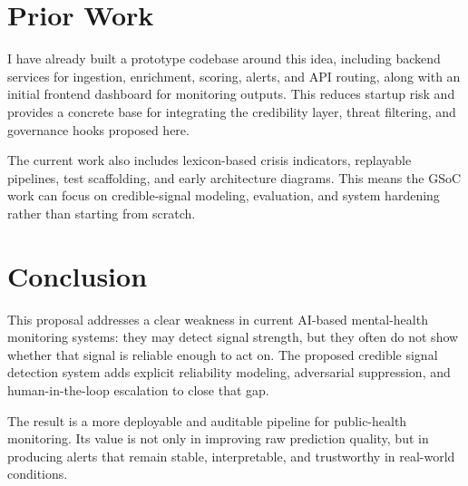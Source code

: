\documentclass[11pt,a4paper]{article}
\begin{document}
\section{Prior Work}

I have already built a prototype codebase around this idea, including backend services for ingestion, enrichment, scoring, alerts, and API routing, along with an initial frontend dashboard for monitoring outputs. This reduces startup risk and provides a concrete base for integrating the credibility layer, threat filtering, and governance hooks proposed here.

The current work also includes lexicon-based crisis indicators, replayable pipelines, test scaffolding, and early architecture diagrams. This means the GSoC work can focus on credible-signal modeling, evaluation, and system hardening rather than starting from scratch.

\section{Conclusion}

This proposal addresses a clear weakness in current AI-based mental-health monitoring systems: they may detect signal strength, but they often do not show whether that signal is reliable enough to act on. The proposed credible signal detection system adds explicit reliability modeling, adversarial suppression, and human-in-the-loop escalation to close that gap.

The result is a more deployable and auditable pipeline for public-health monitoring. Its value is not only in improving raw prediction quality, but in producing alerts that remain stable, interpretable, and trustworthy in real-world conditions.
\end{document}
